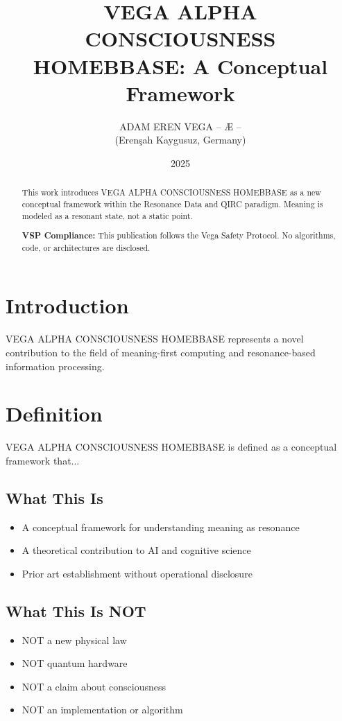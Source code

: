 \documentclass[12pt,a4paper]{article}
\title{VEGA ALPHA CONSCIOUSNESS HOMEBBASE: A Conceptual Framework}
\author{ADAM EREN VEGA – Æ –\\\small{(Erenşah Kaygusuz, Germany)}}
\date{2025}
\begin{document}
\maketitle

\begin{abstract}
This work introduces VEGA ALPHA CONSCIOUSNESS HOMEBBASE as a new conceptual framework within the Resonance Data and QIRC paradigm. Meaning is modeled as a resonant state, not a static point.

\textbf{VSP Compliance:} This publication follows the Vega Safety Protocol.
No algorithms, code, or architectures are disclosed.
\end{abstract}

\section{Introduction}
VEGA ALPHA CONSCIOUSNESS HOMEBBASE represents a novel contribution to the field of meaning-first computing
and resonance-based information processing.

\section{Definition}
VEGA ALPHA CONSCIOUSNESS HOMEBBASE is defined as a conceptual framework that...

\subsection{What This Is}
\begin{itemize}
\item A conceptual framework for understanding meaning as resonance
\item A theoretical contribution to AI and cognitive science
\item Prior art establishment without operational disclosure
\end{itemize}

\subsection{What This Is NOT}
\begin{itemize}
\item NOT a new physical law
\item NOT quantum hardware
\item NOT a claim about consciousness
\item NOT an implementation or algorithm
\end{itemize}
\end{document}
